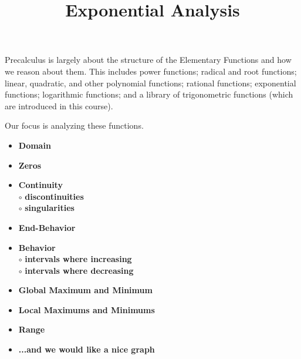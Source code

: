\documentclass{ximera}
\title{Exponential Analysis}
\begin{document}
\begin{abstract}
\end{abstract}
\maketitle




Precalculus is largely about the structure of the Elementary Functions and how we reason about them.  This includes power functions; radical and root functions; linear, quadratic, and other polynomial functions; rational functions; exponential functions; logarithmic functions; and a library of trigonometric functions (which are introduced in this course).


Our focus is analyzing these functions.





\begin{itemize}
     \item \textbf{\textcolor{red!70!black}{Domain}} 
     \item \textbf{\textcolor{red!70!black}{Zeros}} 
     \item \textbf{\textcolor{red!70!black}{Continuity}} \\
     \text{    }$\circ$ \textbf{\textcolor{purple!85!blue}{discontinuities}}\\
     \text{    }$\circ$ \textbf{\textcolor{purple!85!blue}{singularities}}\\
     \item \textbf{\textcolor{red!70!black}{End-Behavior}} 
     \item \textbf{\textcolor{red!70!black}{Behavior}} \\
     \text{    }$\circ$ \textbf{\textcolor{purple!85!blue}{intervals where increasing}}\\
     \text{    }$\circ$ \textbf{\textcolor{purple!85!blue}{intervals where decreasing}}\\
     \item \textbf{\textcolor{red!70!black}{Global Maximum and Minimum}} 
     \item \textbf{\textcolor{red!70!black}{Local Maximums and Minimums}} 
     \item \textbf{\textcolor{red!70!black}{Range}} 
     \item \textbf{\textcolor{blue!55!black}{...and we would like a nice graph}} 
\end{itemize}
\end{document}
